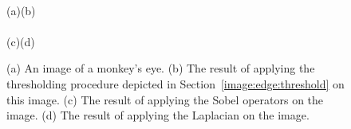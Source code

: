 \begin{figure}[tb]
  \paragraph{}
  \hspace*{0.28\textwidth}(a)\hspace*{0.38\textwidth}(b)
  \paragraph{}
  \hspace*{0.28\textwidth}(c)\hspace*{0.38\textwidth}(d)
  \caption{\label{fig:compare}(a) An image of a monkey's eye.  (b) The
    result of applying the thresholding procedure depicted in
    Section~\protect\ref{image:edge:threshold} on this image.  (c) The
    result of applying the Sobel operators on the image.  (d) The
    result of applying the Laplacian on the image.}
\end{figure}

